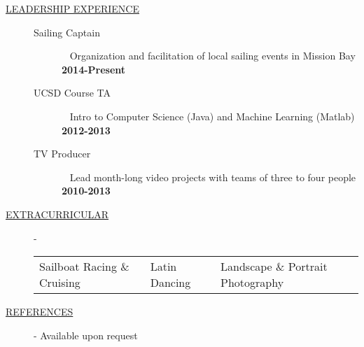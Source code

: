 \documentclass[11pt]{article}
\begin{document}
\begin{description}
    \item[\underline{LEADERSHIP EXPERIENCE}] \hfill
        \begin{description}
            \item[Sailing Captain] \textbullet ~ Organization and facilitation of local sailing events in Mission Bay \hfill \textbf{2014-Present}\\
            \item[UCSD Course TA]
                \textbullet ~ Intro to Computer Science (Java) and Machine Learning (Matlab)    \hfill \textbf{2012-2013}\\
            \item[TV Producer] \textbullet ~ Lead month-long video projects with teams of three to four people \hfill \textbf{2010-2013}\\
        \end{description}

    \item[\underline{EXTRACURRICULAR}] -
        \begin{tabular}{l|l|l}
            Sailboat Racing \& Cruising & Latin Dancing & Landscape \& Portrait Photography
        \end{tabular}

    \item[\underline{REFERENCES}] - Available upon request

\end{description}
\end{document}
